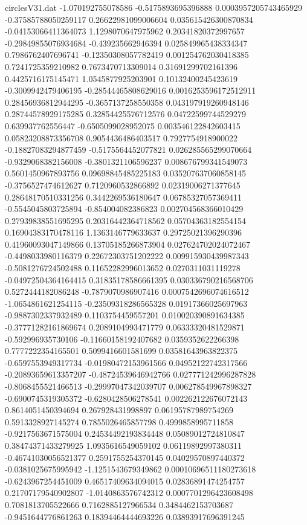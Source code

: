 \begin{filecontents}{circlesV31.dat}
-1.070192755078586	-0.5175893695396888	0.0003957205743465929
-0.37585788050259117	0.26622981099006604	0.035615426300870834
-0.04153066411364073	1.1298070647975962	0.20341820372997657
-0.29849855076934684	-0.439235662946394	0.025849965438334347
0.7986762407696741	-0.12350308057782419	0.001254762030418385
0.7241725359210982	0.7673470713309014	0.31691299702161396
0.4425716175145471	1.0545877925203901	0.10132400245423619
-0.3009942479406195	-0.28544465808629016	0.0016253596172512911
0.28456936812944295	-0.3657137258550358	0.043197919260948146
0.28744578929175285	0.32854425576712576	0.04722599744529279
0.639937762556447	-0.6505099028952075	0.003546122842603415
0.05823208873356708	0.9054436486403517	0.7927754918900022
-0.18827083294877459	-0.5175564452077821	0.026285565299070664
-0.9329068382156008	-0.3801321106596237	0.008676799341549073
0.5601450967893756	0.09698845485225183	0.035207637060858145
-0.3756527474612627	0.7120960532866892	0.02319006271377645
0.28648170510331256	0.3442269536180647	0.06785327057369411
-0.5545045803725894	-0.854004082386823	0.002704568366010429
0.27939838551695295	0.20316442364718562	0.05704363182554154
0.16904383170478116	1.1363146779633637	0.29725021396290396
0.41960093047149866	0.13705185266873904	0.027624702024072467
-0.4498033980116379	0.22672303751202222	0.009915930439987343
-0.5081276724502488	0.11652282996013652	0.0270311031119278
-0.04972504364164415	0.31835178586661395	0.030336790216568706
0.5272444182086248	-0.7879070986907416	0.0007542696074616512
-1.0654861621254115	-0.23509318286565328	0.01917366025697963
-0.9887302337932489	0.1103754459557201	0.010020390891634385
-0.37771282161869674	0.2089104993471779	0.06333320481529871
-0.592996935730106	-0.11660158192407682	0.0359352622266398
0.7777222354165501	0.5099416601581699	0.03581643963822375
-0.6597553949317734	-0.01980472153961566	0.04952122742317566
-0.20893659613357207	-0.48724539646942766	0.027771242996287828
-0.8068455521466513	-0.29997047342039707	0.006278549967898327
-0.6900745319305372	-0.6280428506278541	0.002262122676072143
0.8614051450394694	0.267928431998897	0.06195787989754269
0.5913328927145274	0.7855026465857798	0.4999858995711858
-0.9217563671575004	0.24534492193834448	0.05089012724810847
0.38474371433279925	1.0935616549059102	0.06119892997380311
-0.46741030056521377	0.2591755254370145	0.04029570897440372
-0.0381025675995942	-1.1251543679349862	0.00010696511180273618
-0.6243967254451009	0.46517409634094015	0.02836891474254757
0.21707179540902807	-1.0140863576742312	0.0007701296423608498
0.7081813705522666	0.7162885127966534	0.3484462153703687
-0.9451644776861263	0.18394464444693226	0.03893917696391245

\end{filecontents}
